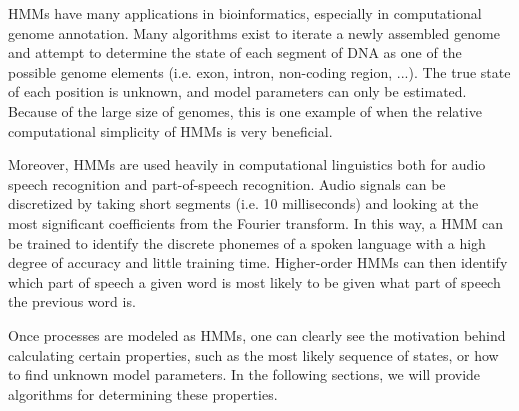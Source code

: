 HMMs have many applications in bioinformatics, especially in computational genome annotation. Many algorithms exist to iterate a newly assembled genome and attempt to determine the state of each segment of DNA as one of the possible genome elements (i.e. exon, intron, non-coding region, ...). The true state of each position is unknown, and model parameters can only be estimated. Because of the large size of genomes, this is one example of when the relative computational simplicity of HMMs is very beneficial. 

Moreover, HMMs are used heavily in computational linguistics both for audio speech recognition and part-of-speech recognition. Audio signals can be discretized by taking short segments (i.e. 10 milliseconds) and looking at the most significant coefficients from the Fourier transform. In this way, a HMM can be trained to identify the discrete phonemes of a spoken language with a high degree of accuracy and little training time. Higher-order HMMs can then identify which part of speech a given word is most likely to be given what part of speech the previous word is.

Once processes are modeled as HMMs, one can clearly see the motivation behind calculating certain properties, such as the most likely sequence of states, or how to find unknown model parameters. In the following sections, we will provide algorithms for determining these properties.